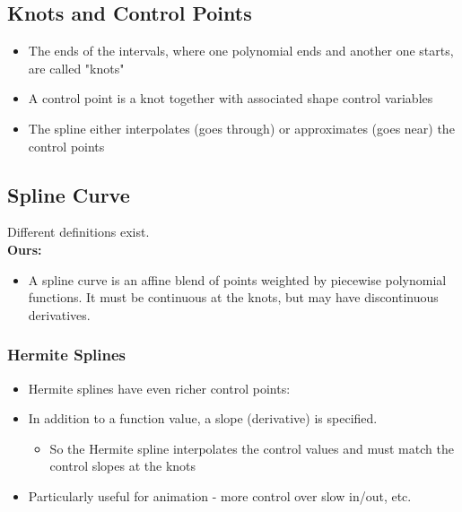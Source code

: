 \documentclass{article}
\begin{document}
\subsection*{Knots and Control Points}
\begin{itemize}
    \item The ends of the intervals, where one polynomial ends and another one starts, are called "knots"
    \item A control point is a knot together with associated shape control variables
    \item The spline either interpolates (goes through) or approximates (goes near) the control points    
\end{itemize}

\subsection*{Spline Curve}
Different definitions exist.\\
\textbf{Ours:}
\begin{itemize}
    \item A spline curve is an affine blend of points weighted by piecewise polynomial functions.  It must be continuous at the knots, but may have discontinuous derivatives.
\end{itemize}

\subsubsection*{Hermite Splines}
\begin{itemize}
    \item Hermite splines have even richer control points:
    \item In addition to a function value, a slope (derivative) is specified.
    \begin{itemize}
        \item So the Hermite spline interpolates the control values and must match the control slopes at the knots
    \end{itemize}
    \item Particularly useful for animation - more control over slow in/out, etc.
\end{itemize}
\end{document}
